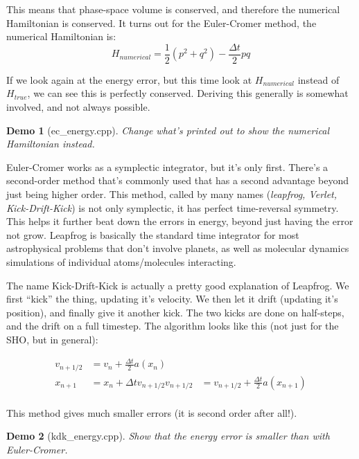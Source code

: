 \documentclass{article}
\theoremstyle{demo}
\newtheorem{demo}{Demo}[section]
\begin{document}
This means that phase-space volume is conserved, and therefore the numerical
Hamiltonian is conserved.  It turns out for the Euler-Cromer method, the
numerical Hamiltonian is:
\begin{equation}
    H_{numerical} = \frac{1}{2}(p^2 + q^2) - \frac{\Delta t}{2}pq
\end{equation}

If we look again at the energy error, but this time look at $H_{numerical}$
instead of $H_{true}$, we can see this is perfectly conserved.  Deriving this
generally is somewhat involved, and not always possible.

\begin{demo}[ec\_energy.cpp]
   Change what's printed out to show the numerical Hamiltonian instead.
\end{demo}

Euler-Cromer works as a symplectic integrator, but it's only first.
There's a second-order method that's commonly used that has a second advantage
beyond just being higher order.  This method, called by many names
(\textit{leapfrog, Verlet, Kick-Drift-Kick}) is not only symplectic, it has
perfect time-reversal symmetry.  This helps it further beat down the errors in
energy, beyond just having the error not grow.  Leapfrog is basically the
standard time integrator for most astrophysical problems that don't involve
planets, as well as molecular dynamics simulations of individual atoms/molecules
interacting.

The name Kick-Drift-Kick is actually a pretty good explanation of Leapfrog.  We
first ``kick'' the thing, updating it's velocity.  We then let it drift
(updating it's position), and finally give it another kick.  The two kicks are
done on half-steps, and the drift on a full timestep.  The algorithm looks like
this (not just for the SHO, but in general):

\begin{equation}
    \begin{aligned}
        v_{n+1/2} &= v_n + \frac{\Delta t}{2} a(x_n) \\
        x_{n+1} &= x_n + \Delta t v_{n+1/2}
        v_{n+1/2} &= v_{n+1/2} + \frac{\Delta t}{2} a(x_{n+1}) \\
    \end{aligned}
\end{equation}

This method gives much smaller errors (it is second order after all!).
\begin{demo}[kdk\_energy.cpp]
    Show that the energy error is smaller than with Euler-Cromer.
\end{demo}
\end{document}
